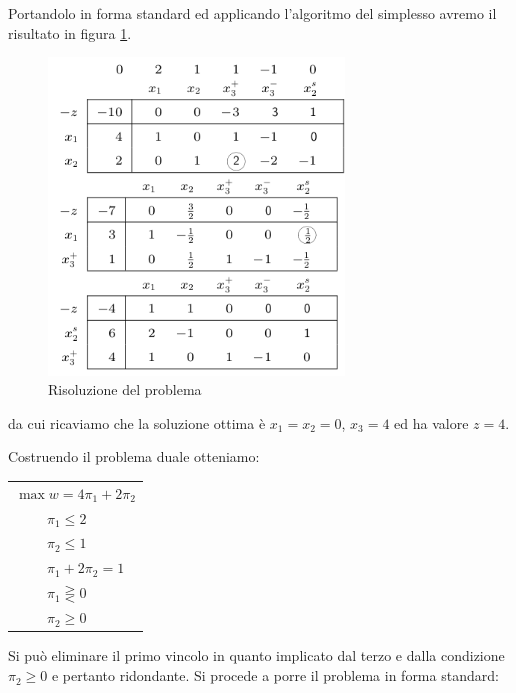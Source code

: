 \documentclass[11pt]{book}
\begin{document}
Portandolo in forma standard ed applicando l'algoritmo del simplesso
avremo il risultato in figura \ref{cap5tab2}.

\begin{figure}[h!]
  \centering
  \includegraphics[width=0.7\textwidth]{images/cap5tab2.png}
  \caption{Risoluzione del problema}
  \label{cap5tab2}
\end{figure}

da cui ricaviamo che la soluzione ottima \`e $x_1 = x_2 = 0$, $x_3 =
4$ ed ha valore $z = 4$. 

Costruendo il problema duale otteniamo:

\vspace{11pt}
\begin{center}
\begin{tabular}{l}
$\max w = 4\pi_1 + 2\pi_2$\\
$\phantom{min z}\pi_1 \leq 2$\\
$\phantom{min z}\pi_2 \leq 1$\\
$\phantom{min z}\pi_1 + 2\pi_2 = 1$\\
$\phantom{min z}\pi_1 \gtreqless 0$\\
$\phantom{min z}\pi_2 \geq 0$\\
\end{tabular}
\end{center}
\vspace{11pt}

Si pu\`o eliminare il primo vincolo in quanto implicato dal terzo e
dalla condizione $\pi_2 \geq 0$ e pertanto ridondante. Si procede a
porre il problema in forma standard:
\end{document}
